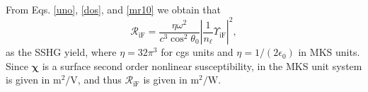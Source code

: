 From Eqs. \eqref{uno},
\eqref{dos}, and \eqref{mr10} we obtain that
\begin{equation}\label{mc6}
\mathcal{R}_{\mathrm{iF}}
=\frac{\eta\omega^{2}}{c^{3}\cos^{2}\theta_{0}}
\left\vert  
\frac{1}{n_{\ell}}
\Upsilon_{\mathrm{iF}}
\right\vert^{2} 
,
\end{equation}
as the SSHG yield, where $\eta =32\pi^3$ for cgs units and
$\eta=1/(2\epsilon_0)$ in MKS units. Since $\boldsymbol{\chi}$ is a surface
second order nonlinear susceptibility, in the MKS unit system is given in
$\mathrm{m}^{2}/\mathrm{V}$, and thus $\mathcal{R}_{\mathrm{iF}}$ is given in
$\mathrm{m}^{2}/\mathrm{W}$.
